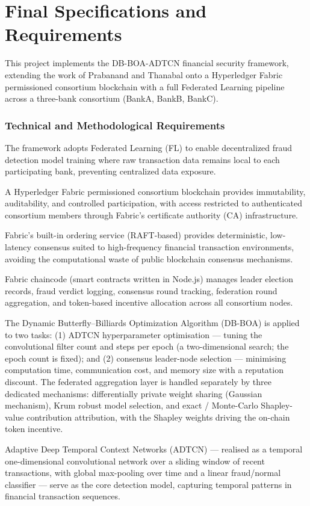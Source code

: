 \section{Final Specifications and Requirements}
This project implements the DB-BOA-ADTCN financial security framework, extending the work of Prabanand and Thanabal \cite{prabanand2025} onto a Hyperledger Fabric permissioned consortium blockchain with a full Federated Learning pipeline across a three-bank consortium (BankA, BankB, BankC).

\subsubsection*{Technical and Methodological Requirements}

The framework adopts Federated Learning (FL) to enable decentralized fraud detection model training where raw transaction data remains local to each participating bank, preventing centralized data exposure.

A Hyperledger Fabric permissioned consortium blockchain provides immutability, auditability, and controlled participation, with access restricted to authenticated consortium members through Fabric's certificate authority (CA) infrastructure.

Fabric's built-in ordering service (RAFT-based) provides deterministic, low-latency consensus suited to high-frequency financial transaction environments, avoiding the computational waste of public blockchain consensus mechanisms.

Fabric chaincode (smart contracts written in Node.js) manages leader election records, fraud verdict logging, consensus round tracking, federation round aggregation, and token-based incentive allocation across all consortium nodes.

The Dynamic Butterfly--Billiards Optimization Algorithm (DB-BOA) is applied to two tasks: (1) ADTCN hyperparameter optimisation — tuning the convolutional filter count and steps per epoch (a two-dimensional search; the epoch count is fixed); and (2) consensus leader-node selection — minimising computation time, communication cost, and memory size with a reputation discount. The federated aggregation layer is handled separately by three dedicated mechanisms: differentially private weight sharing (Gaussian mechanism), Krum robust model selection, and exact / Monte-Carlo Shapley-value contribution attribution, with the Shapley weights driving the on-chain token incentive.

Adaptive Deep Temporal Context Networks (ADTCN) — realised as a temporal one-dimensional convolutional network over a sliding window of recent transactions, with global max-pooling over time and a linear fraud/normal classifier — serve as the core detection model, capturing temporal patterns in financial transaction sequences.

